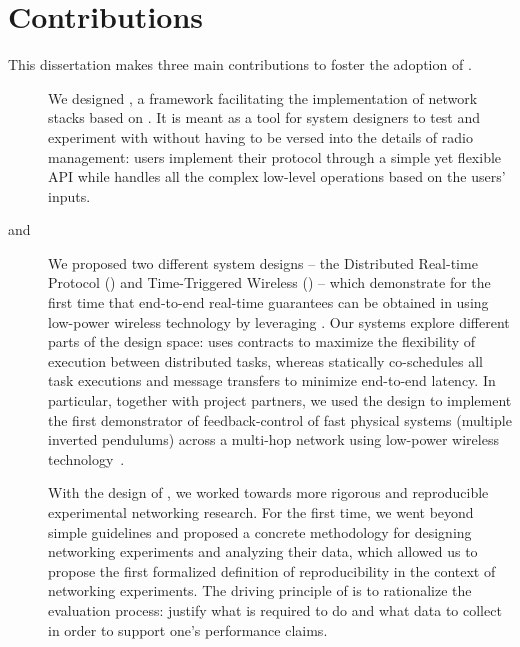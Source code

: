 \section{Contributions}
This dissertation makes three main contributions to foster the adoption of \ST.

\begin{description}

    \item[\baloo]
    We designed \baloo, a framework facilitating the implementation of network stacks based on \ST.
    It is meant as a tool for system designers to test and experiment with \ST without having to be versed into the details of radio management: users implement their protocol through a simple yet flexible API while \baloo handles all the complex low-level operations based on the users' inputs.

    \item[\DRP and \TTW]
    We proposed two different system designs -- the Distributed Real-time Protocol (\DRP) and Time-Triggered Wireless (\TTW) -- which demonstrate for the first time that end-to-end real-time guarantees can be obtained in \CPS using low-power wireless technology by leveraging \ST.
    Our systems explore different parts of the design space:
    \DRP uses contracts to maximize the flexibility of execution between distributed tasks, whereas
    \TTW statically co-schedules all task executions and message transfers to minimize end-to-end latency.
    In particular, together with project partners, we used the \TTW design to implement the first demonstrator of feedback-control of fast physical systems (multiple inverted pendulums) across a multi-hop network using low-power wireless technology~\cite{mager2019Demo}.

    \item[\triscale]
    With the design of \triscale, we worked towards more rigorous and reproducible experimental networking research.
    For the first time, we went beyond simple guidelines and proposed a concrete methodology for designing networking experiments and analyzing their data, which allowed us to propose the first formalized definition of reproducibility in the context of networking experiments.
    The driving principle of \triscale is to rationalize the evaluation process: \ie justify what is required to do and what data to collect in order to support one's performance claims.


\end{description}

